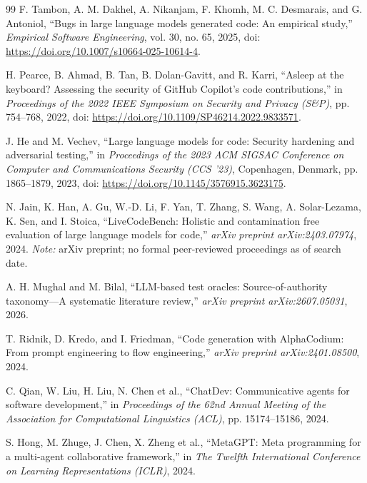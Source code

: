 \documentclass[10pt,a4paper]{article}
\begin{document}
\begin{thebibliography}{99}
F. Tambon, A. M. Dakhel, A. Nikanjam, F. Khomh, M. C. Desmarais, and G. Antoniol, ``Bugs in large language models generated code: An empirical study,'' \textit{Empirical Software Engineering}, vol. 30, no. 65, 2025, doi: \url{https://doi.org/10.1007/s10664-025-10614-4}.

H. Pearce, B. Ahmad, B. Tan, B. Dolan-Gavitt, and R. Karri, ``Asleep at the keyboard? Assessing the security of GitHub Copilot's code contributions,'' in \textit{Proceedings of the 2022 IEEE Symposium on Security and Privacy (S\&P)}, pp. 754--768, 2022, doi: \url{https://doi.org/10.1109/SP46214.2022.9833571}.

J. He and M. Vechev, ``Large language models for code: Security hardening and adversarial testing,'' in \textit{Proceedings of the 2023 ACM SIGSAC Conference on Computer and Communications Security (CCS '23)}, Copenhagen, Denmark, pp. 1865--1879, 2023, doi: \url{https://doi.org/10.1145/3576915.3623175}.

N. Jain, K. Han, A. Gu, W.-D. Li, F. Yan, T. Zhang, S. Wang, A. Solar-Lezama, K. Sen, and I. Stoica, ``LiveCodeBench: Holistic and contamination free evaluation of large language models for code,'' \textit{arXiv preprint arXiv:2403.07974}, 2024. \textit{Note:} arXiv preprint; no formal peer-reviewed proceedings as of search date.

A. H. Mughal and M. Bilal, ``LLM-based test oracles: Source-of-authority taxonomy---A systematic literature review,'' \textit{arXiv preprint arXiv:2607.05031}, 2026.

T. Ridnik, D. Kredo, and I. Friedman, ``Code generation with AlphaCodium: From prompt engineering to flow engineering,'' \textit{arXiv preprint arXiv:2401.08500}, 2024.

C. Qian, W. Liu, H. Liu, N. Chen et al., ``ChatDev: Communicative agents for software development,'' in \textit{Proceedings of the 62nd Annual Meeting of the Association for Computational Linguistics (ACL)}, pp. 15174--15186, 2024.

S. Hong, M. Zhuge, J. Chen, X. Zheng et al., ``MetaGPT: Meta programming for a multi-agent collaborative framework,'' in \textit{The Twelfth International Conference on Learning Representations (ICLR)}, 2024.


\end{thebibliography}
\end{document}
